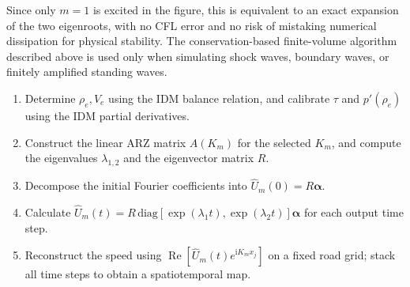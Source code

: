 \documentclass[11pt,a4paper,openany]{book}
\numberwithin{equation}{chapter}
\numberwithin{figure}{chapter}
\numberwithin{table}{chapter}
\begin{document}
Since only $m=1$ is excited in the figure, this is equivalent to an exact expansion of the two eigenroots, with no CFL error and no risk of mistaking numerical dissipation for physical stability. The conservation-based finite-volume algorithm described above is used only when simulating shock waves, boundary waves, or finitely amplified standing waves.










\begin{tcolorbox}[experimentbox,title=\textbf{Pseudocode for the E13/E14 Linear Spectrum Algorithm}]
\small
\begin{enumerate}[leftmargin=1.7em,itemsep=2pt]
\item




Determine $\rho_e,V_e$ using the IDM balance relation, and calibrate $\tau$ and $p'(\rho_e)$ using the IDM partial derivatives.







\item




Construct the linear ARZ matrix $A(K_m)$ for the selected $K_m$, and compute the eigenvalues $\lambda_{1,2}$ and the eigenvector matrix $R$.







\item




Decompose the initial Fourier coefficients into $\widehat U_m(0)=R\boldsymbol\alpha$.


\item Calculate $\widehat U_m(t)=R\,\mathrm{diag}[\exp(\lambda_1t),\exp(\lambda_2t)]\boldsymbol\alpha$ for each output time step.







\item




 Reconstruct the speed using $\operatorname{Re}[\widehat U_m(t)e^{\mathrm{i}K_mx_j}]$ on a fixed road grid; stack all time steps to obtain a spatiotemporal map.







\end{enumerate}
\end{tcolorbox}
\end{document}
